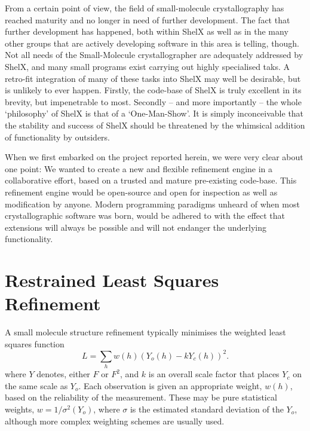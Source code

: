 \documentclass[pdf]{iucr}
\begin{document}
From a certain point of view, the field of small-molecule crystallography has reached maturity and no longer in need of further development. The fact that further development has happened, both within ShelX as well as in the many other groups that are actively developing software in this area is telling, though. Not all needs of the Small-Molecule crystallographer are adequately addressed by ShelX, and many small programs exist carrying out highly specialised taks. A retro-fit integration of many of these tasks into ShelX may well be desirable, but is unlikely to ever happen. Firstly, the code-base of ShelX is truly excellent in its brevity, but impenetrable to most. Secondly -- and more importantly -- the whole `philosophy' of ShelX is that of a `One-Man-Show'.  It is simply inconceivable that the stability and success of ShelX should be threatened by the whimsical addition of functionality by outsiders.

When we first embarked on the project reported herein, we were very clear about one point: We wanted to create a new and flexible refinement engine in a collaborative effort, based on a trusted and mature pre-existing code-base. This refinement engine would be open-source and open for inspection as well as modification by anyone. Modern programming paradigms unheard of when most crystallographic software was born, would be adhered to with the effect that extensions will always be possible and will not endanger the underlying functionality.


\section{Restrained Least Squares Refinement}
\label{sec:restraints}

A small molecule structure refinement typically minimises the weighted least squares function
\begin{equation}
L = \sum_h w(h) (Y_o(h) - k Y_c(h))^2.
\label{eqn:L:def}
\end{equation}
where $Y$ denotes, either $F$ or $F^2$, and $k$ is an overall scale factor that places $Y_c$ on the same scale as $Y_o$. Each observation is given an appropriate weight, $w(h)$, based on the reliability of the measurement. These may be pure statistical weights, $w = 1/\sigma^2(Y_o)$, where $\sigma$ is the estimated standard deviation of the $Y_o$, although more complex weighting schemes are usually used.
%
\end{document}
